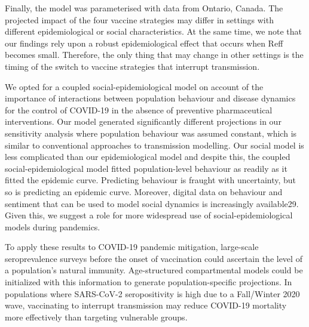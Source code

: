 Finally, the model was parameterised with data from Ontario, Canada. The projected impact of the four vaccine strategies may differ in settings with different epidemiological or social characteristics.  At the same time, we note that our findings rely upon a robust epidemiological effect that occurs when Reff becomes small. Therefore, the only thing that may change in other settings is the timing of the switch to vaccine strategies that interrupt transmission. 

We opted for a coupled social-epidemiological model on account of the importance of interactions between population behaviour and disease dynamics for the control of COVID-19 in the absence of preventive pharmaceutical interventions. Our model generated significantly different projections in our sensitivity analysis where population behaviour was assumed constant, which is similar to conventional approaches to transmission modelling. Our social model is less complicated than our epidemiological model and despite this, the coupled social-epidemiological model fitted population-level behaviour as readily as it fitted the epidemic curve. Predicting behaviour is fraught with uncertainty, but so is predicting an epidemic curve. Moreover, digital data on behaviour and sentiment that can be used to model social dynamics is increasingly available29.  Given this, we suggest a role for more widespread use of  social-epidemiological models during pandemics. 

To apply these results to COVID-19 pandemic mitigation, large-scale seroprevalence surveys before the onset of vaccination could ascertain the level of a population's natural immunity.  Age-structured compartmental models could be initialized with this information to generate population-specific projections. In populations where SARS-CoV-2 seropositivity is high due to a Fall/Winter 2020 wave, vaccinating to interrupt transmission may reduce COVID-19 mortality more effectively than targeting vulnerable groups. 
